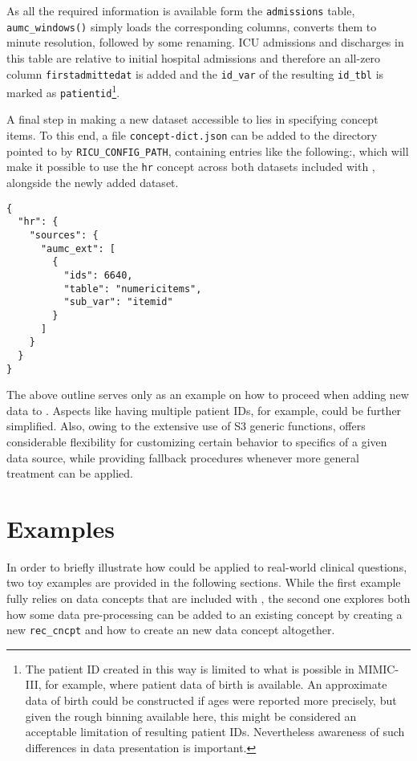 \documentclass[
  notitle]{jss}
\begin{document}
As all the required information is available form the
\texttt{admissions} table, \texttt{aumc\_windows()} simply loads the
corresponding columns, converts them to minute resolution, followed by
some renaming. ICU admissions and discharges in this table are relative
to initial hospital admissions and therefore an all-zero column
\texttt{firstadmittedat} is added and the \texttt{id\_var} of the
resulting \texttt{id\_tbl} is marked as \texttt{patientid}\footnote{The
  patient ID created in this way is limited to what is possible in
  MIMIC-III, for example, where patient data of birth is available. An
  approximate data of birth could be constructed if ages were reported
  more precisely, but given the rough binning available here, this might
  be considered an acceptable limitation of resulting patient IDs.
  Nevertheless awareness of such differences in data presentation is
  important.}.

A final step in making a new dataset accessible to  lies in
specifying concept items. To this end, a file \texttt{concept-dict.json}
can be added to the directory pointed to by \texttt{RICU\_CONFIG\_PATH},
containing entries like the following:, which will make it possible to
use the \texttt{hr} concept across both datasets included with
, alongside the newly added dataset.

\begin{verbatim}
{
  "hr": {
    "sources": {
      "aumc_ext": [
        {
          "ids": 6640,
          "table": "numericitems",
          "sub_var": "itemid"
        }
      ]
    }
  }
}
\end{verbatim}

The above outline serves only as an example on how to proceed when
adding new data to . Aspects like having multiple patient IDs,
for example, could be further simplified. Also, owing to the extensive
use of S3 generic functions,  offers considerable flexibility
for customizing certain behavior to specifics of a given data source,
while providing fallback procedures whenever more general treatment can
be applied.

\hypertarget{examples}{%
\section{Examples}\label{examples}}

In order to briefly illustrate how  could be applied to
real-world clinical questions, two toy examples are provided in the
following sections. While the first example fully relies on data
concepts that are included with , the second one explores both
how some data pre-processing can be added to an existing concept by
creating a new \texttt{rec\_cncpt} and how to create an new data concept
altogether.
\end{document}
